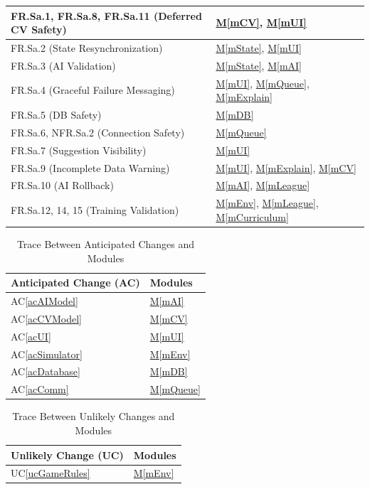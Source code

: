 \documentclass[12pt, titlepage]{article}
\newcommand{\acref}[1]{AC\ref{#1}}
\newcommand{\uref}[1]{UC\ref{#1}}
\newcommand{\mref}[1]{\hyperref[sec:#1]{M\ref*{#1}}}
\begin{document}
\begin{table}[H]
\begin{tabularx}{\textwidth}{|l|X|}
\hline
FR.Sa.1, FR.Sa.8, FR.Sa.11 (Deferred CV Safety) & \mref{mCV}, \mref{mUI} \\
\hline
FR.Sa.2 (State Resynchronization) & \mref{mState}, \mref{mUI} \\
\hline
FR.Sa.3 (AI Validation) & \mref{mState}, \mref{mAI} \\
\hline
FR.Sa.4 (Graceful Failure Messaging) & \mref{mUI}, \mref{mQueue}, \mref{mExplain} \\
\hline
FR.Sa.5 (DB Safety) & \mref{mDB} \\
\hline
FR.Sa.6, NFR.Sa.2 (Connection Safety) & \mref{mQueue} \\
\hline
FR.Sa.7 (Suggestion Visibility) & \mref{mUI} \\
\hline
FR.Sa.9 (Incomplete Data Warning) & \mref{mUI}, \mref{mExplain}, \mref{mCV} \\
\hline
FR.Sa.10 (AI Rollback) & \mref{mAI}, \mref{mLeague} \\
\hline
FR.Sa.12, 14, 15 (Training Validation) & \mref{mEnv}, \mref{mLeague}, \mref{mCurriculum} \\
\hline
\end{tabularx}
\end{table}



\begin{table}[H]
\centering
\caption{Trace Between Anticipated Changes and Modules}
\label{TblACT}
\begin{tabular}{|l|l|}
\hline
\textbf{Anticipated Change (AC)} & \textbf{Modules}\\
\hline
\acref{acAIModel} & \mref{mAI} \\
\hline
\acref{acCVModel} & \mref{mCV} \\
\hline
\acref{acUI} & \mref{mUI} \\
\hline
\acref{acSimulator} & \mref{mEnv} \\
\hline
\acref{acDatabase} & \mref{mDB} \\
\hline
\acref{acComm} & \mref{mQueue} \\
\hline
\end{tabular}
\end{table}

\begin{table}[H]
\centering
\caption{Trace Between Unlikely Changes and Modules}
\label{TblUCT}
\begin{tabular}{|l|l|}
\hline
\textbf{Unlikely Change (UC)} & \textbf{Modules}\\
\hline
\uref{ucGameRules} & \mref{mEnv} \\
\hline
\end{tabular}
\end{table}
\end{document}
